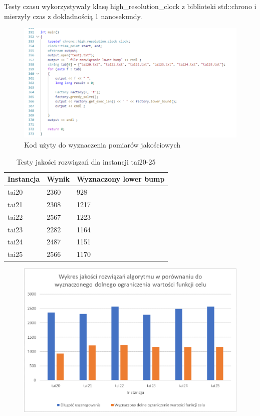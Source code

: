 \documentclass[]{article}
\begin{document}
	Testy czasu wykorzystywały klasę high\_resolution\_clock z biblioteki std::chrono i mierzyły czas z dokładnością 1 nanosekundy.
	
	\begin{figure}[h!]
		\includegraphics[width=\linewidth]{kod_testy_jakosci}
		\caption{Kod użyty do wyznaczenia pomiarów jakościowych}
	\end{figure}

	\begin{table}[h!]
		\centering
		\caption{Testy jakości rozwiązań dla instancji tai20-25}
		\begin{tabular}{|l|l|l|}
			\hline
			
			Instancja & Wynik & Wyznaczony lower bump \\ \hline
			tai20 & 2360 & 928 \\ \hline
			tai21 & 2308 & 1217 \\ \hline
			tai22 & 2567 & 1223 \\ \hline
			tai23 & 2282 & 1164 \\ \hline
			tai24 & 2487 & 1151 \\ \hline
			tai25 & 2566 & 1170 \\ \hline
			
		\end{tabular}
	\end{table}
	
	\begin{figure}%
		\includegraphics[width=\linewidth]{wykres3}
	\end{figure}
	
\end{document}
